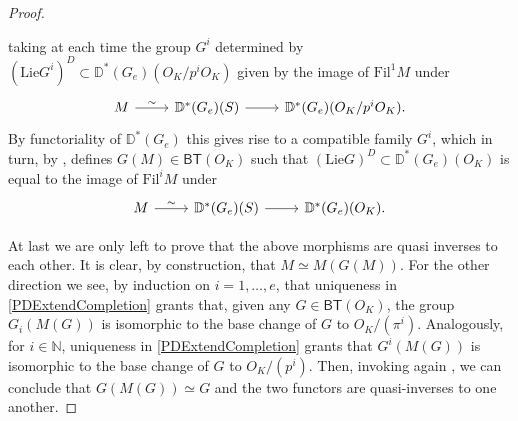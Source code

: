 \begin{proof}
\begin{enumerate}
	taking at each time the group $G^i$ determined by $(\mathrm{Lie} G^i)^D \subset
	\mathbb{D}^*(G_e)(O_K/p^iO_K)$ given by the image of $\mathrm{Fil}^1 M$ under
	\begin{equation*}
	\begin{tikzcd}
		M \arrow[r, "\sim", rightarrow] &
		\mathbb{D}^*(G_e)(S) \arrow[r, "", rightarrow] &
		\mathbb{D}^*(G_e)(O_K/p^iO_K)
	.\end{tikzcd}
	\end{equation*}
	By functoriality of $\mathbb{D}^*(G_e)$ this gives rise to a compatible family $G^i$,
	which in turn, by \cite[Lemma 2.4.4]{deJong}, defines $G(M) \in \mathsf{BT}(O_K)$
	such that $(\mathrm{Lie}G)^D \subset \mathbb{D}^*(G_e)(O_K)$ is
	equal to the image of $\mathrm{Fil}^iM$ under
	\begin{equation*}
	\begin{tikzcd}
		M \arrow[r, "\sim", rightarrow] &
		\mathbb{D}^*(G_e)(S) \arrow[r, "", rightarrow] &
		\mathbb{D}^*(G_e)(O_K)
	.\end{tikzcd}
	\end{equation*}
\end{enumerate}
At last we are only left to prove that the above morphisms are quasi inverses to each other.
It is clear, by construction, that $M \simeq M(G(M))$.
For the other direction we see, by induction on $i = 1, \ldots, e$, that uniqueness in
\cref{PDExtendCompletion} grants that, given any $G \in \mathsf{BT}(O_K)$, 
the group $G_i(M(G))$ is isomorphic to the base change of $G$ to $O_K/ (\pi^i)$.
Analogously, for $i \in \mathbb{N}$, uniqueness in \cref{PDExtendCompletion} grants
that $G^i(M(G))$ is isomorphic to the base change of $G$ to $O_K/ (p^i)$.
Then, invoking again \cite[Lemma 2.4.4]{deJong}, we can conclude that $G(M(G)) \simeq G$
and the two functors are quasi-inverses to one another.
\end{proof}


